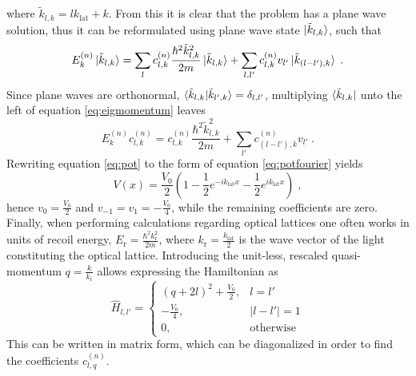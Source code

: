 where $\tilde{k}_{l,k} = l k_{\mathrm{lat}} + k$. From this it is clear that the problem has a plane wave solution, thus it can be reformulated using plane wave state $\ket{\tilde{k}_{l,k}}$, such that
\begin{equation}
	E_{k}^{(n)} \ket{\tilde{k}_{l,k}} = \sum_l c_{l,k}^{(n)} \frac{\hbar^2 \tilde{k}_{l,k}^2}{2 m} \ket{\tilde{k}_{l,k}} + \sum_{l,l'} c_{l,k}^{(n)} v_{l'} \ket{\tilde{k}_{(l-l'),k}} \; . \label{eq:eigmomentum}
\end{equation}
Since plane waves are orthonormal, $\braket{\tilde{k}_{l,k} | \tilde{k}_{l',k}} = \delta_{l,l'}$, multiplying $\bra{\tilde{k}_{l,k} }$ unto the left of equation \ref{eq:eigmomentum} leaves
\begin{equation}
	E_{k}^{(n)} c_{l,k}^{(n)} =  c_{l,k}^{(n)} \frac{\hbar^2 \tilde{k}_{l,k}^2}{2 m}  + \sum_{l'} c_{(l-l'),k}^{(n)} v_{l'} \; .
\end{equation}
Rewriting equation \ref{eq:pot} to the form of equation \ref{eq:potfourier} yields
\begin{equation}
	V(x) = \frac{V_0}{2} \left( 1 - \frac{1}{2} e^{-i k_{\mathrm{lat}} x} - \frac{1}{2} e^{i k_{\mathrm{lat}} x} \right) \; ,
\end{equation}
hence $v_0 = \frac{V_0}{2}$ and $v_{-1} = v_{1} = - \frac{V_0}{4}$, while the remaining coefficients are zero.
Finally, when performing calculations regarding optical lattices one often works in units of recoil energy, $E_{\mathrm{r}} = \frac{\hbar^2 k_{\mathrm{r}}^2}{2 m}$, where $k_{\mathrm{r}} = \frac{k_{\mathrm{lat}}}{2}$ is the wave vector of the light constituting the optical lattice. Introducing the unit-less, rescaled quasi-momentum $q = \frac{k}{k_{\mathrm{r}}}$ allows expressing the Hamiltonian as
\begin{equation*}
\hat{H}_{l,l'} =
    \begin{cases}
     	 (q + 2 l)^2 + \frac{V_0}{2} , & l = l'  \\
     	 - \frac{V_0}{4} , & | l - l'| = 1  \\
     	 0 , & \text{otherwise} 
    \end{cases}
\end{equation*}
This can be written in matrix form, which can be diagonalized in order to find the coefficients $c_{l,q}^{(n)}$.

